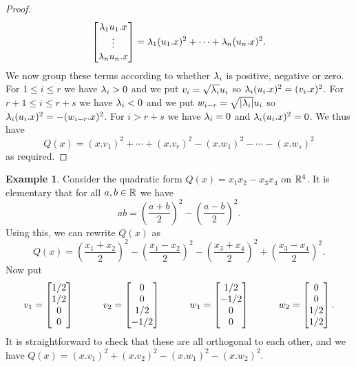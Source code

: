 \documentclass[reqno]{amsart}
\theoremstyle{definition}
\newtheorem{example}[theorem]{Example}
\begin{document}
\begin{proof}
\begin{align*}
   \left[\begin{matrix} \lambda_1 u_1.x \\ \vdots \\ \lambda_n u_n.x \end{matrix}\right] =
   \lambda_1(u_1.x)^2 + \dotsb + \lambda_n(u_n.x)^2.
 \end{align*}
 We now group these terms according to whether $\lambda_i$ is positive,
 negative or zero.  For $1\leq i\leq r$ we have $\lambda_i>0$ and we put
 $v_i=\sqrt{\lambda_i}u_i$ so $\lambda_i(u_i.x)^2=(v_i.x)^2$.  For
 $r+1\leq i\leq r+s$ we have $\lambda_i<0$ and we put
 $w_{i-r}=\sqrt{|\lambda_i|}u_i$ so $\lambda_i(u_i.x)^2=-(w_{i-r}.x)^2$.  For
 $i>r+s$ we have $\lambda_i=0$ and $\lambda_i(u_i.x)^2=0$.  We thus have
 \[ Q(x) = (x.v_1)^2 + \dotsb + (x.v_r)^2 
           - (x.w_1)^2 - \dotsb - (x.w_s)^2
 \]
 as required.
\end{proof}

\begin{example}\label{eg-quadratic-diag-i}
 Consider the quadratic form $Q(x)=x_1x_2-x_3x_4$ on ${\mathbb{R}}^4$.  It is
 elementary that for all $a,b\in{\mathbb{R}}$ we have 
 \[ ab = \left(\frac{a+b}{2}\right)^2 - 
         \left(\frac{a-b}{2}\right)^2.
 \]
 Using this, we can rewrite $Q(x)$ as
 \[ Q(x) =
     \left(\frac{x_1+x_2}{2}\right)^2
   - \left(\frac{x_1-x_2}{2}\right)^2
   - \left(\frac{x_3+x_4}{2}\right)^2
   + \left(\frac{x_3-x_4}{2}\right)^2.
 \]
 Now put 
 \[ 
    v_1 = \left[\begin{matrix} 1/2 \\ 1/2 \\ 0 \\ 0 \end{matrix}\right] \hspace{3em}
    v_2 = \left[\begin{matrix} 0 \\ 0 \\ 1/2 \\ -1/2 \end{matrix}\right] \hspace{3em}
    w_1 = \left[\begin{matrix} 1/2 \\ -1/2 \\ 0 \\ 0 \end{matrix}\right] \hspace{3em}
    w_2 = \left[\begin{matrix} 0 \\ 0 \\ 1/2 \\ 1/2 \end{matrix}\right].
 \]
 It is straightforward to check that these are all orthogonal to each
 other, and we have $Q(x)=(x.v_1)^2+(x.v_2)^2-(x.w_1)^2-(x.w_2)^2$.  
\end{example}
\end{document}
